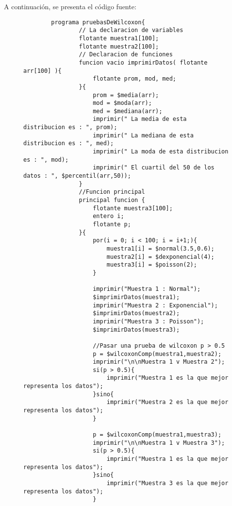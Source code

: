 A continuación, se presenta el código fuente:
\begin{figure}[htbp]
    \centering
    \tiny
    \begin{lstlisting}
        programa pruebasDeWilcoxon{
                // La declaracion de variables
                flotante muestra1[100];
                flotante muestra2[100];
                // Declaracion de funciones
                funcion vacio imprimirDatos( flotante arr[100] ){
                    flotante prom, mod, med;
                }{
                    prom = $media(arr);
                    mod = $moda(arr);
                    med = $mediana(arr);
                    imprimir(" La media de esta distribucion es : ", prom);
                    imprimir(" La mediana de esta distribucion es : ", med);
                    imprimir(" La moda de esta distribucion es : ", mod);
                    imprimir(" El cuartil del 50 de los datos : ", $percentil(arr,50));
                }
                //Funcion principal
                principal funcion {
                    flotante muestra3[100];
                    entero i;
                    flotante p;
                }{
                    por(i = 0; i < 100; i = i+1;){
                        muestra1[i] = $normal(3.5,0.6);
                        muestra2[i] = $dexponencial(4);
                        muestra3[i] = $poisson(2);
                    }
            
                    imprimir("Muestra 1 : Normal");
                    $imprimirDatos(muestra1);
                    imprimir("Muestra 2 : Exponencial");
                    $imprimirDatos(muestra2);
                    imprimir("Muestra 3 : Poisson");
                    $imprimirDatos(muestra3);
            
                    //Pasar una prueba de wilcoxon p > 0.5
                    p = $wilcoxonComp(muestra1,muestra2);
                    imprimir("\n\nMuestra 1 v Muestra 2");
                    si(p > 0.5){
                        imprimir("Muestra 1 es la que mejor representa los datos");
                    }sino{
                        imprimir("Muestra 2 es la que mejor representa los datos");
                    }
            
                    p = $wilcoxonComp(muestra1,muestra3);
                    imprimir("\n\nMuestra 1 v Muestra 3");
                    si(p > 0.5){
                        imprimir("Muestra 1 es la que mejor representa los datos");
                    }sino{
                        imprimir("Muestra 3 es la que mejor representa los datos");
                    }
            

\end{lstlisting}
\end{figure}
